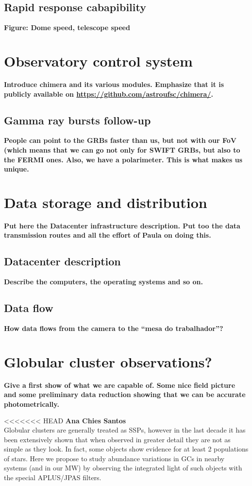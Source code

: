 \documentclass[12pt,preprint]{aastex}
\begin{document}
\subsection{Rapid response cabapibility}
{\bf \color{red} Figure: Dome speed, telescope speed}

\section{Observatory control system}
{\bf \color{red} Introduce chimera and its various modules. Emphasize that it is publicly available on \url{https://github.com/astroufsc/chimera/}. }

\subsection{Gamma ray bursts follow-up}
{\bf \color{red} People can point to the GRBs faster than us, but not with our FoV (which means that we can go not only for SWIFT GRBs, but also to the FERMI ones. Also, we have a polarimeter. This is what makes us unique.}

\section{Data storage and distribution}
{\bf \color{red} Put here the Datacenter infrastructure description. Put too the data transmission routes and all the effort of Paula on doing this.}

\subsection{Datacenter description}
{\bf \color{red} Describe the computers, the operating systems and so on.}

\subsection{Data flow}
{\bf \color{red} How data flows from the camera to the ``mesa do trabalhador''?}

\section{Globular cluster observations?}
{\bf \color{red} Give a first show of what we are capable of. Some nice field picture and some preliminary data reduction showing that we can be accurate photometrically.}

<<<<<<< HEAD
{\bf Ana Chies Santos}\\
Globular clusters are generally treated as SSPs, however in the last decade it has been extensively shown that when observed in greater detail they are not as simple as they look. In fact, some objects show evidence for at least 2 populations of stars. Here we propose to study abundance variations in GCs in nearby systems (and in our MW) by observing the integrated light of such objects with the special APLUS/JPAS filters.
\end{document}
